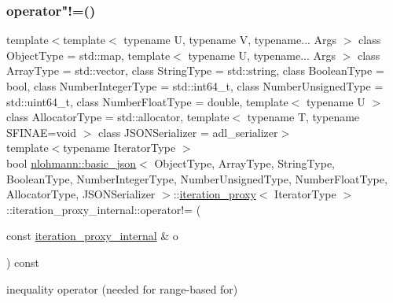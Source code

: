 \mbox{\label{classnlohmann_1_1basic__json_1_1iteration__proxy_1_1iteration__proxy__internal_ac0c280ff3ade3a04e6ffe5fa57ed7359}} 
\subsubsection{\texorpdfstring{operator"!=()}{operator!=()}}
{\footnotesize\ttfamily template$<$template$<$ typename U, typename V, typename... Args $>$ class Object\+Type = std\+::map, template$<$ typename U, typename... Args $>$ class Array\+Type = std\+::vector, class String\+Type  = std\+::string, class Boolean\+Type  = bool, class Number\+Integer\+Type  = std\+::int64\+\_\+t, class Number\+Unsigned\+Type  = std\+::uint64\+\_\+t, class Number\+Float\+Type  = double, template$<$ typename U $>$ class Allocator\+Type = std\+::allocator, template$<$ typename T, typename S\+F\+I\+N\+A\+E=void $>$ class J\+S\+O\+N\+Serializer = adl\+\_\+serializer$>$ \\
template$<$typename Iterator\+Type $>$ \\
bool \hyperlink{classnlohmann_1_1basic__json}{nlohmann\+::basic\+\_\+json}$<$ Object\+Type, Array\+Type, String\+Type, Boolean\+Type, Number\+Integer\+Type, Number\+Unsigned\+Type, Number\+Float\+Type, Allocator\+Type, J\+S\+O\+N\+Serializer $>$\+::\hyperlink{classnlohmann_1_1basic__json_1_1iteration__proxy}{iteration\+\_\+proxy}$<$ Iterator\+Type $>$\+::iteration\+\_\+proxy\+\_\+internal\+::operator!= (\begin{DoxyParamCaption}\item[{const \hyperlink{classnlohmann_1_1basic__json_1_1iteration__proxy_1_1iteration__proxy__internal}{iteration\+\_\+proxy\+\_\+internal} \&}]{o }\end{DoxyParamCaption}) const\hspace{0.3cm}{\ttfamily [inline]}}



inequality operator (needed for range-\/based for) 

